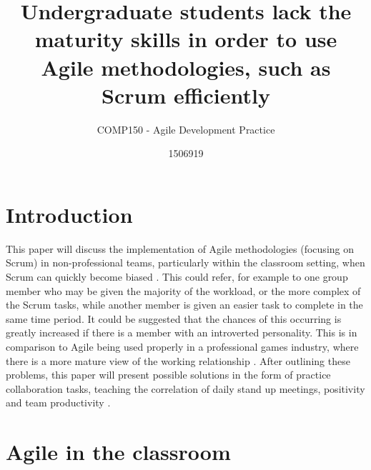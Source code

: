 \documentclass{scrartcl}
\title{Undergraduate students lack the maturity skills in order to use Agile methodologies, such as Scrum efficiently}
\subtitle{COMP150 - Agile Development Practice}
\author{1506919}
\begin{document}
\maketitle


\section{Introduction}

This paper will discuss the implementation of Agile methodologies \cite{beck2001manifesto} (focusing on Scrum) in non-professional teams, particularly within the classroom setting, when Scrum can quickly become biased \cite{kropp2014teaching}. This could refer, for example to one group member who may be given the majority of the workload, or the more complex of the Scrum tasks, while another member is given an easier task to complete in the same time period. It could be suggested that the chances of this occurring is greatly increased if there is a member with an introverted personality. This is in comparison to Agile being used properly in a professional games industry, where there is a more mature view of the working relationship \cite{kropp2016teaching}. After outlining these problems, this paper will present possible solutions in the form of practice collaboration tasks, teaching the correlation of daily stand up meetings, positivity and team productivity \cite{kropp2016teaching}.

\section{Agile in the classroom}
\end{document}
